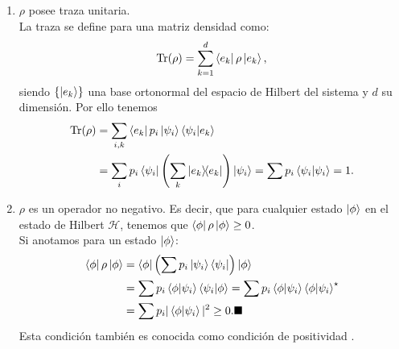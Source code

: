 \documentclass[letterpaper,12pt]{thesisECFM}
\theoremstyle{plain}
\theoremstyle{definition}
\theoremstyle{definition}
\theoremstyle{remark}
\newcommand{\1}{\mathbb{1}}
\begin{document}
\begin{enumerate}
\item $\rho$ posee traza unitaria.\\
La traza se define para una matriz densidad como:
\begin{equation}
    \label{ec:1.18}
    \text{Tr}(\rho) = \sum_{k=1}^{d} \bra{e_k} \rho \ket{e_k},
\end{equation}
siendo $\{\ket{e_k}\}$ una base ortonormal del espacio de Hilbert del sistema y $d$ su
dimensión. Por ello tenemos
\begin{align}
    \text{Tr}(\rho) & = \sum_{i,k} \bra{e_k}p_i\ket{\psi_i} \braket{\psi_i}{e_k} \\
    & = \sum_i p_i \bra{\psi_i} \left( \sum_k \ketbra{e_k} \right) \ket{\psi_i}
= \sum{p_i} \braket{\psi_i} = 1.
\end{align}
\item $\rho$ es un operador no negativo. Es decir, que para cualquier estado $\ket{\phi}$ en el estado de Hilbert $\mathcal{H}$, tenemos que $\bra{\phi}\rho\ket{\phi} \geq 0$.\\
Si anotamos para un estado $\ket{\phi}$:
\begin{align}
\bra{\phi}\rho\ket{\phi} & = \bra{\phi} \left(\sum p_i \ket{\psi_i} \bra{\psi_i}   \right)     \ket{\phi}\\
& = \sum p_i \bra{\phi}\ket{\psi_i}\bra{\psi_i}\ket{\phi}  = \sum p_i \bra{\phi}\ket{\psi_i} \bra{\phi}\ket{\psi_i}^{\star}\\
& = \sum p_i |\bra{\phi}\ket{\psi_i}| ^2 \geq 0. \blacksquare
\end{align}  
Esta condición también es conocida como condición de positividad \cite{nielsen_chuang_2011}.
\end{enumerate}

\end{document}
